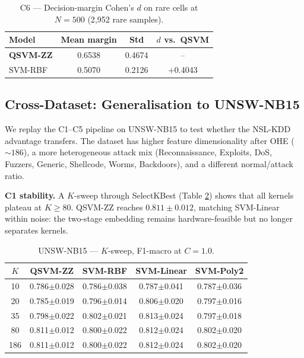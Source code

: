 \documentclass[journal]{IEEEtran}
\newcommand{\ZZ}{\textsc{ZZ}}
\newcommand{\QSVM}{QSVM-\ZZ}
\begin{document}
  \begin{table}[t]
  \centering
  \caption{C6 --- Decision-margin Cohen's $d$ on rare cells at
    $N{=}500$ (2{,}952 rare samples).}
  \label{tab:c6-cohen}
  \small
  \begin{tabular}{lccc}
  \toprule
  Model & Mean margin & Std & $d$ vs.\ QSVM\\\midrule
  \textbf{QSVM-\ZZ{}} & 0.6538 & 0.4674 & --\\
  SVM-RBF             & 0.5070 & 0.2126 & $+$0.4043\\
  \bottomrule
  \end{tabular}
  \end{table}

  \subsection{Cross-Dataset: Generalisation to UNSW-NB15}
  We replay the C1--C5 pipeline on UNSW-NB15 to test whether the
  NSL-KDD advantage transfers. The dataset has higher feature
  dimensionality after OHE ($\sim 186$), a more heterogeneous attack
  mix (Reconnaissance, Exploits, DoS, Fuzzers, Generic, Shellcode,
  Worms, Backdoors), and a different normal/attack ratio.

  \textbf{C1 stability.} A $K$-sweep through SelectKBest (Table
  \ref{tab:c1-unsw}) shows that all kernels plateau at $K{\ge}80$.
  \QSVM{} reaches $0.811\!\pm\!0.012$, matching SVM-Linear within
  noise: the two-stage embedding remains hardware-feasible but no
  longer separates kernels.

  \begin{table}[t]
  \centering
  \caption{UNSW-NB15 --- $K$-sweep, F1-macro at $C{=}1.0$.}
  \label{tab:c1-unsw}
  \small
  \begin{tabular}{ccccc}
  \toprule
  $K$ & QSVM-\ZZ{} & SVM-RBF & SVM-Linear & SVM-Poly2\\\midrule
  10  & 0.786$\pm$0.028 & 0.786$\pm$0.038 & 0.787$\pm$0.041 & 0.787$\pm$0.036\\
  20  & 0.785$\pm$0.019 & 0.796$\pm$0.014 & 0.806$\pm$0.020 & 0.797$\pm$0.016\\
  35  & 0.798$\pm$0.022 & 0.802$\pm$0.021 & 0.813$\pm$0.024 & 0.797$\pm$0.018\\
  80  & 0.811$\pm$0.012 & 0.800$\pm$0.022 & 0.812$\pm$0.024 & 0.802$\pm$0.020\\
  186 & 0.811$\pm$0.012 & 0.800$\pm$0.022 & 0.812$\pm$0.024 & 0.802$\pm$0.020\\
  \bottomrule
  \end{tabular}
  \end{table}
\end{document}
